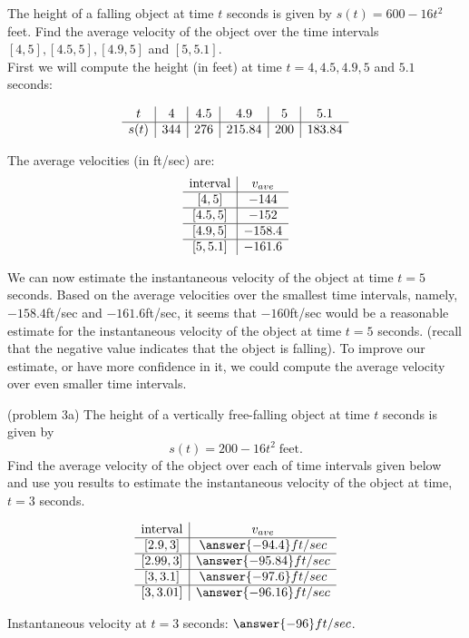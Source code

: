 \documentclass[handout]{ximera}
\begin{document}
\begin{example}[example 3]
The height of a falling object at time $t$ seconds is given by $s(t) = 600-16t^2$ feet.
Find the average velocity of the object over the time intervals $[4, 5], [4.5, 5], [4.9, 5]$ and $[5, 5.1]$.\\
First we will compute the height (in feet) at time $t = 4, 4.5, 4.9, 5$ and $5.1$ seconds:
  
\[
\begin{array}{ c | c | c | c | c | c }
   t& 4 & 4.5 & 4.9 & 5 & 5.1 \\ 
	\hline
	s(t) & 344 & 276 & 215.84 & 200 & 183.84
\end{array}
\]

The average velocities (in ft/sec) are:
\[
\begin{array}{ c | c  }
   \text{interval}& v_{ave} \\ 
	\hline
	[4,5] & -144 \\
	\hline
	[4.5,5] & -152 \\
	\hline
	[4.9,5] & -158.4 \\
	\hline
	[5, 5.1] & -161.6
\end{array}
\]

We can now estimate the instantaneous velocity of the object at time $t = 5$ seconds.  Based on the 
average velocities over the smallest time intervals, namely, $-158.4$ft/sec and $-161.6$ft/sec, it seems that $-160$ft/sec would be a reasonable estimate 
for the instantaneous velocity of the object at time $t = 5$ seconds.
(recall that the negative value indicates that the object is falling).
To improve our estimate, or have more confidence in it, we could compute the average velocity over 
even smaller time intervals.

\end{example}

\begin{problem}(problem 3a)
The height of a vertically free-falling object at time $t$ seconds is given by
\[
s(t) = 200 - 16t^2 \; \text{feet}.
\]
Find the average velocity of the object over each of time intervals given below and use you results to estimate the instantaneous velocity
of the object at time, $t = 3$ seconds.

\[
\begin{array}{ c | c  }
   \text{interval}& v_{ave} \\ 
	\hline
	[2.9, 3] & \answer{-94.4}ft/sec \\
	\hline
	[2.99, 3] & \answer{-95.84}ft/sec \\
	\hline
	[3, 3.1] & \answer{-97.6}ft/sec \\
	\hline
	[3, 3.01] & \answer{-96.16}ft/sec
\end{array}
\]


Instantaneous velocity at $t = 3$ seconds: $\answer{-96}ft/sec$.

\end{problem}
\end{document}
